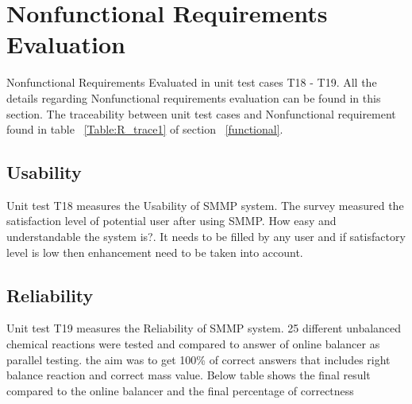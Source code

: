 \documentclass[12pt, titlepage]{article}
\begin{document}
\section{Nonfunctional Requirements Evaluation}
Nonfunctional Requirements Evaluated in unit test cases T18 - T19. All the details regarding Nonfunctional requirements evaluation can be found in this section. The traceability between unit test cases and Nonfunctional requirement found in table ~\ref{Table:R_trace1} of section ~\ref{functional}.

\subsection{Usability}

Unit test T18 measures the Usability of SMMP system. The survey measured the satisfaction level of potential user after using SMMP. How easy and understandable the system is?. It needs to be filled by any user and if satisfactory level is low then enhancement need to be taken into account. 

\subsection{Reliability}

Unit test T19 measures the Reliability of SMMP system. 25 different unbalanced chemical reactions were tested and compared to answer of online balancer \cite{OnlineBalancer} as parallel testing. the aim was to get 100\% of correct answers that includes right balance reaction and correct mass value. Below table shows the final result compared to the online balancer and the final percentage of correctness 
\end{document}
